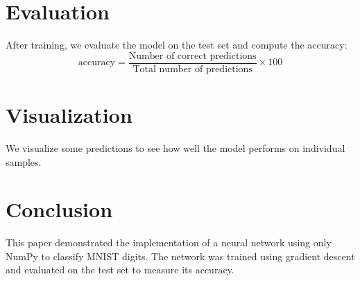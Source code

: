 \documentclass{article}
\begin{document}
\section{Evaluation}
After training, we evaluate the model on the test set and compute the accuracy:
\begin{equation}
\text{accuracy} = \frac{\text{Number of correct predictions}}{\text{Total number of predictions}} \times 100
\end{equation}

\section{Visualization}
We visualize some predictions to see how well the model performs on individual samples.

\section{Conclusion}
This paper demonstrated the implementation of a neural network using only NumPy to classify MNIST digits. The network was trained using gradient descent and evaluated on the test set to measure its accuracy.
\end{document}
